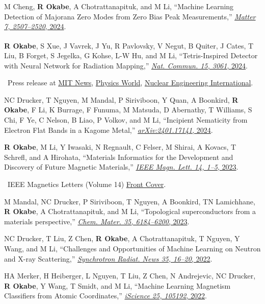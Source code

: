 \documentclass[10pt,a4paper]{article}
\newcommand{\note}[1]{\par{\hspace{1.2em}\textbullet\ #1}}
\newcommand{\cofirst}{\textsuperscript{\dag}}
\newcommand{\me}{\textbf{R Okabe}}
\begin{document}
\begin{cvenum}
  \item M Cheng, \me, A Chotrattanapituk, and M Li, ``Machine Learning Detection of Majorana Zero Modes from Zero Bias Peak Measurements,'' \href{https://doi.org/10.1016/j.matt.2024.05.028}{\textit{Matter 7, 2507--2520}, 2024}.
  \item \me\cofirst, S Xue\cofirst, J Vavrek\cofirst, J Yu, R Pavlovsky, V Negut, B Quiter, J Cates, T Liu, B Forget, S Jegelka, G Kohse, L-W Hu, and M Li, ``Tetris-Inspired Detector with Neural Network for Radiation Mapping,'' \href{https://doi.org/10.1038/s41467-024-47338-w}{\textit{Nat. Commun. 15, 3061}, 2024}.
    \note{Press release at \href{https://news.mit.edu/2024/mit-researchers-develop-tetris-inspired-radiation-detector-0410}{MIT News}, \href{https://physicsworld.com/a/tetris-inspired-radiation-detector-uses-machine-learning/}{Physics World}, \href{https://www.neimagazine.com/analysis/tetris-ai-and-radiation-mapping/}{Nuclear Engineering International}.}
  \item NC Drucker, T Nguyen, M Mandal, P Siriviboon, Y Quan, A Boonkird, \me, F Li, K Burrage, F Funuma, M Matsuda, D Abernathy, T Williams, S Chi, F Ye, C Nelson, B Liao, P Volkov, and M Li, ``Incipient Nematicity from Electron Flat Bands in a Kagome Metal,'' \href{https://arxiv.org/abs/2401.17141}{\textit{arXiv:2401.17141}, 2024}.
  \item \me, M Li, Y Iwasaki, N Regnault, C Felser, M Shirai, A Kovacs, T Schrefl, and A Hirohata, ``Materials Informatics for the Development and Discovery of Future Magnetic Materials,'' \href{https://doi.org/10.1109/LMAG.2023.3320888}{\textit{IEEE Magn. Lett. 14, 1--5}, 2023}.
    \note{IEEE Magnetics Letters (Volume 14) \href{https://ieeexplore.ieee.org/abstract/document/10477287}{Front Cover}.}
  \item M Mandal, NC Drucker, P Siriviboon, T Nguyen, A Boonkird, TN Lamichhane, \me, A Chotrattanapituk, and M Li, ``Topological superconductors from a materials perspective,'' \href{https://doi.org/10.1021/acs.chemmater.3c00713}{\textit{Chem. Mater. 35, 6184--6200}, 2023}.
  \item NC Drucker, T Liu, Z Chen, \me, A Chotrattanapituk, T Nguyen, Y Wang, and M Li, ``Challenges and Opportunities of Machine Learning on Neutron and X-ray Scattering,'' \href{https://doi.org/10.1080/08940886.2022.2112498}{\textit{Synchrotron Radiat. News 35, 16--20}, 2022}.
  \item HA Merker, H Heiberger, L Nguyen, T Liu, Z Chen, N Andrejevic, NC Drucker, \me, Y Wang, T Smidt, and M Li, ``Machine Learning Magnetism Classifiers from Atomic Coordinates,'' \href{https://doi.org/10.1016/j.isci.2022.105192}{\textit{iScience 25, 105192}, 2022}.

\end{cvenum}
\end{document}
